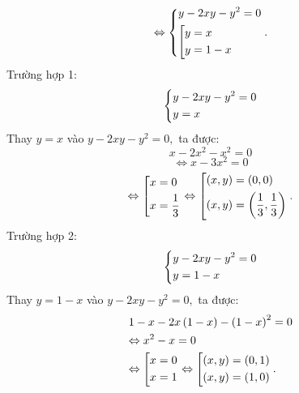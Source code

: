 \documentclass[12pt,a4paper]{article}
\begin{document}
\[ \Leftrightarrow \left\{ \begin{gathered}
  y - 2xy - {y^2} = 0 \hfill \\
  \left[ \begin{gathered}
  y = x \hfill \\
  y = 1 - x \hfill \\ 
\end{gathered}  \right. \hfill \\ 
\end{gathered}  \right..\]
Trường hợp 1: \[\left\{ \begin{gathered}
  y - 2xy - {y^2} = 0 \hfill \\
  y = x \hfill \\ 
\end{gathered}  \right.\]
Thay \(y = x\) vào \(y - 2xy - y^2 = 0,\) ta được:
\[x - 2x^2 - x^2 = 0\]
\[ \Leftrightarrow x - 3{x^2} = 0\]
\[ \Leftrightarrow \left[ \begin{gathered}
  x = 0 \hfill \\
  x = \frac{1}{3} \hfill \\ 
\end{gathered}  \right. \Leftrightarrow \left[ \begin{gathered}
  \left( {x,y} \right) = \left( {0,0} \right) \hfill \\
  \left( {x,y} \right) = \left( {\frac{1}{3},\frac{1}{3}} \right) \hfill \\ 
\end{gathered}  \right..\]
Trường hợp 2: \[\left\{ \begin{gathered}
  y - 2xy - {y^2} = 0 \hfill \\
  y = 1 - x \hfill \\ 
\end{gathered}  \right.\]
Thay \(y = 1 - x\) vào \(y - 2xy - y^2 = 0,\) ta được:
\[\begin{gathered}
  1 - x - 2x\left( {1 - x} \right) - {\left( {1 - x} \right)^2} = 0 \hfill \\
   \Leftrightarrow {x^2} - x = 0 \hfill \\
   \Leftrightarrow \left[ \begin{gathered}
  x = 0 \hfill \\
  x = 1 \hfill \\ 
\end{gathered}  \right. \Leftrightarrow \left[ \begin{gathered}
  \left( {x,y} \right) = \left( {0,1} \right) \hfill \\
  \left( {x,y} \right) = \left( {1,0} \right) \hfill \\ 
\end{gathered}  \right.. \hfill \\ 
\end{gathered} \]
\end{document}
